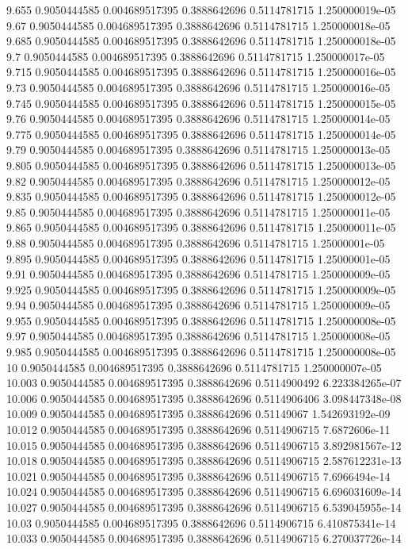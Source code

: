 {9.655 0.9050444585 0.004689517395 0.3888642696 0.5114781715 1.250000019e-05
9.67 0.9050444585 0.004689517395 0.3888642696 0.5114781715 1.250000018e-05
9.685 0.9050444585 0.004689517395 0.3888642696 0.5114781715 1.250000018e-05
9.7 0.9050444585 0.004689517395 0.3888642696 0.5114781715 1.250000017e-05
9.715 0.9050444585 0.004689517395 0.3888642696 0.5114781715 1.250000016e-05
9.73 0.9050444585 0.004689517395 0.3888642696 0.5114781715 1.250000016e-05
9.745 0.9050444585 0.004689517395 0.3888642696 0.5114781715 1.250000015e-05
9.76 0.9050444585 0.004689517395 0.3888642696 0.5114781715 1.250000014e-05
9.775 0.9050444585 0.004689517395 0.3888642696 0.5114781715 1.250000014e-05
9.79 0.9050444585 0.004689517395 0.3888642696 0.5114781715 1.250000013e-05
9.805 0.9050444585 0.004689517395 0.3888642696 0.5114781715 1.250000013e-05
9.82 0.9050444585 0.004689517395 0.3888642696 0.5114781715 1.250000012e-05
9.835 0.9050444585 0.004689517395 0.3888642696 0.5114781715 1.250000012e-05
9.85 0.9050444585 0.004689517395 0.3888642696 0.5114781715 1.250000011e-05
9.865 0.9050444585 0.004689517395 0.3888642696 0.5114781715 1.250000011e-05
9.88 0.9050444585 0.004689517395 0.3888642696 0.5114781715 1.25000001e-05
9.895 0.9050444585 0.004689517395 0.3888642696 0.5114781715 1.25000001e-05
9.91 0.9050444585 0.004689517395 0.3888642696 0.5114781715 1.250000009e-05
9.925 0.9050444585 0.004689517395 0.3888642696 0.5114781715 1.250000009e-05
9.94 0.9050444585 0.004689517395 0.3888642696 0.5114781715 1.250000009e-05
9.955 0.9050444585 0.004689517395 0.3888642696 0.5114781715 1.250000008e-05
9.97 0.9050444585 0.004689517395 0.3888642696 0.5114781715 1.250000008e-05
9.985 0.9050444585 0.004689517395 0.3888642696 0.5114781715 1.250000008e-05
10 0.9050444585 0.004689517395 0.3888642696 0.5114781715 1.250000007e-05
10.003 0.9050444585 0.004689517395 0.3888642696 0.5114900492 6.223384265e-07
10.006 0.9050444585 0.004689517395 0.3888642696 0.5114906406 3.098447348e-08
10.009 0.9050444585 0.004689517395 0.3888642696 0.51149067 1.542693192e-09
10.012 0.9050444585 0.004689517395 0.3888642696 0.5114906715 7.6872606e-11
10.015 0.9050444585 0.004689517395 0.3888642696 0.5114906715 3.892981567e-12
10.018 0.9050444585 0.004689517395 0.3888642696 0.5114906715 2.587612231e-13
10.021 0.9050444585 0.004689517395 0.3888642696 0.5114906715 7.6966494e-14
10.024 0.9050444585 0.004689517395 0.3888642696 0.5114906715 6.696031609e-14
10.027 0.9050444585 0.004689517395 0.3888642696 0.5114906715 6.539045955e-14
10.03 0.9050444585 0.004689517395 0.3888642696 0.5114906715 6.410875341e-14
10.033 0.9050444585 0.004689517395 0.3888642696 0.5114906715 6.270037726e-14
}
